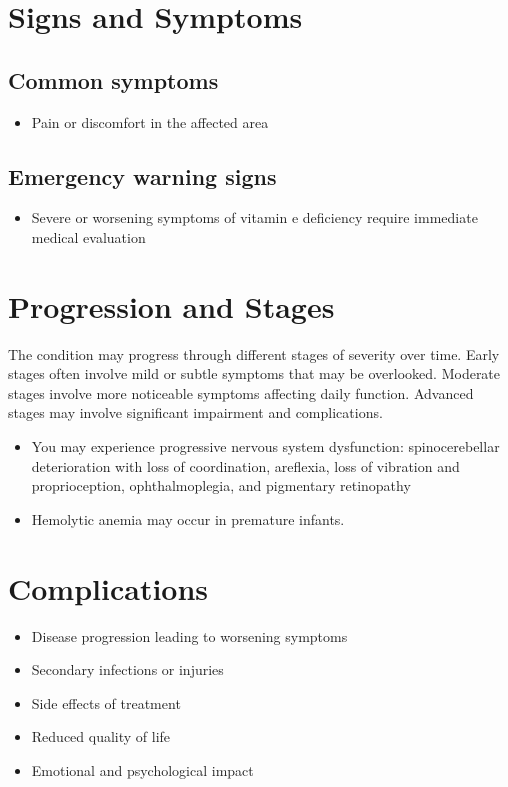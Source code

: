\section{Signs and Symptoms}
\subsection{Common symptoms}
\begin{itemize}[noitemsep]
  \item Pain or discomfort in the affected area
  \end{itemize}
\subsection{Emergency warning signs}
\begin{itemize}[noitemsep]
  \item Severe or worsening symptoms of vitamin e deficiency require immediate medical evaluation
\end{itemize}
\section{Progression and Stages}
The condition may progress through different stages of severity over time. Early stages often involve mild or subtle symptoms that may be overlooked. Moderate stages involve more noticeable symptoms affecting daily function. Advanced stages may involve significant impairment and complications.

\begin{itemize}[noitemsep]
  \item You may experience progressive nervous system dysfunction: spinocerebellar deterioration with loss of coordination, areflexia, loss of vibration and proprioception, ophthalmoplegia, and pigmentary retinopathy
  \item Hemolytic anemia may occur in premature infants.
\end{itemize}
\section{Complications}
\begin{itemize}[noitemsep]
  \item Disease progression leading to worsening symptoms
  \item Secondary infections or injuries
  \item Side effects of treatment
  \item Reduced quality of life
  \item Emotional and psychological impact
\end{itemize}
